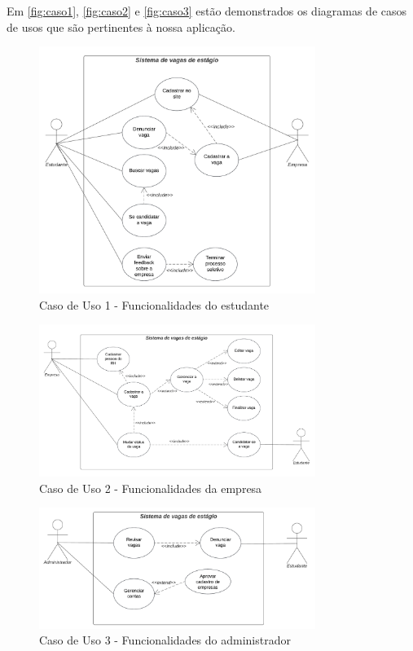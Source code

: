 Em \autoref{fig:caso1}, \autoref{fig:caso2} e \autoref{fig:caso3} estão demonstrados os diagramas de casos de usos que são pertinentes à nossa aplicação.

\begin{figure}[H]
	\centering 
	\caption{\label{fig:caso1}Caso de Uso 1 - Funcionalidades do estudante}
	\includegraphics[width=0.8\textwidth]{imagens/caso-de-uso-1.png} 
\end{figure}

\begin{figure}[H]
	\centering 
	\caption{\label{fig:caso2}Caso de Uso 2 - Funcionalidades da empresa}
	\includegraphics[width=0.8\textwidth]{imagens/caso-de-uso-2.png} 
\end{figure}

\begin{figure}[H]
	\centering 
	\caption{\label{fig:caso3}Caso de Uso 3 - Funcionalidades do administrador}
	\includegraphics[width=0.8\textwidth]{imagens/caso-de-uso-3.png} 
\end{figure}

